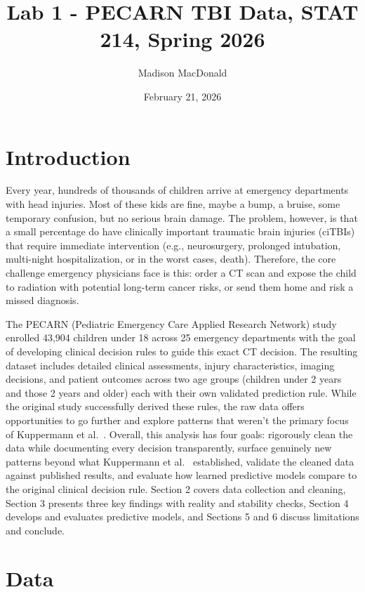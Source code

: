 \documentclass[11pt,letterpaper]{article}
\title{Lab 1 - PECARN TBI Data, STAT 214, Spring 2026}
\author{Madison MacDonald}
\date{February 21, 2026}
\begin{document}
\maketitle
\vspace{-1.5em}

\section{Introduction}\label{introduction}

Every year, hundreds of thousands of children arrive at emergency departments with head injuries. Most of these kids are fine, maybe a bump, a bruise, some temporary confusion, but no serious brain damage. The problem, however, is that a small percentage do have clinically important traumatic brain injuries (ciTBIs) that require immediate intervention (e.g., neurosurgery, prolonged intubation, multi-night hospitalization, or in the worst cases, death). Therefore, the core challenge emergency physicians face is this: order a CT scan and expose the child to radiation with potential long-term cancer risks, or send them home and risk a missed diagnosis. 

The PECARN (Pediatric Emergency Care Applied Research Network) study enrolled 43,904 children under 18 across 25 emergency departments with the goal of developing clinical decision rules to guide this exact CT decision. The resulting dataset includes detailed clinical assessments, injury characteristics, imaging decisions, and patient outcomes across two age groups (children under 2 years and those 2 years and older) each with their own validated prediction rule. While the original study successfully derived these rules, the raw data offers opportunities to go further and explore patterns that weren't the primary focus of Kuppermann et al.~\cite{kuppermann2009}. Overall, this analysis has four goals: rigorously clean the data while documenting every decision transparently, surface genuinely new patterns beyond what Kuppermann et al.~\cite{kuppermann2009} established, validate the cleaned data against published results, and evaluate how learned predictive models compare to the original clinical decision rule. Section 2 covers data collection and cleaning, Section 3 presents three key findings with reality and stability checks, Section 4 develops and evaluates predictive models, and Sections 5 and 6 discuss limitations and conclude. 

\section{Data}\label{data}
\end{document}
